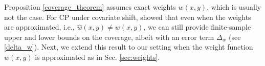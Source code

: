 Proposition \ref{coverage_theorem} assumes  exact weights $w(x, y)$, which is usually not the case. For CP under covariate shift, \cite{lei2020conformal} showed that even when the weights are approximated, i.e., $\hat{w}(x, y) \neq w(x, y)$, we can still provide finite-sample upper and lower bounds on the coverage, albeit with an error term $\Delta_w$ (see \eqref{delta_w}). Next, we extend this result to our setting when the weight function $w(x, y)$ is approximated as in Sec. \ref{sec:weights}.

